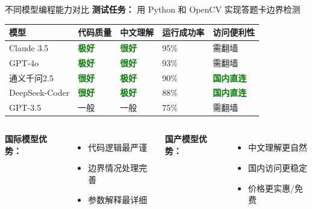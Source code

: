 
\begin{frame}{不同模型编程能力对比}
	\textbf{测试任务：} 用 Python 和 OpenCV 实现答题卡边界检测

	\vspace{0.3cm}

	\begin{table}
		\centering
		\small
		\begin{tabular}{p{2.5cm}p{2.5cm}p{2.5cm}p{2.5cm}p{2.5cm}}
			\toprule
			\textbf{模型} & \textbf{代码质量} & \textbf{中文理解} & \textbf{运行成功率} & \textbf{访问便利性} \\
			\midrule
			Claude 3.5     & \textcolor{green}{\textbf{极好}} & \textcolor{green}{\textbf{很好}} & 95\% & 需翻墙 \\
			GPT-4o         & \textcolor{green}{\textbf{极好}} & \textcolor{green}{\textbf{很好}} & 93\% & 需翻墙 \\
			通义千问2.5    & \textcolor{green}{\textbf{很好}} & \textcolor{green}{\textbf{极好}} & 90\% & \textcolor{green}{\textbf{国内直连}} \\
			DeepSeek-Coder & \textcolor{green}{\textbf{很好}} & \textcolor{green}{\textbf{极好}} & 88\% & \textcolor{green}{\textbf{国内直连}} \\
			GPT-3.5        & 一般 & 一般 & 75\% & 需翻墙 \\
			\bottomrule
		\end{tabular}
	\end{table}

	\vspace{0.3cm}

	\begin{columns}
		\textbf{国际模型优势：}
		\begin{itemize}
			\item 代码逻辑最严谨
			\item 边界情况处理完善
			\item 参数解释最详细
		\end{itemize}

		\textbf{国产模型优势：}
		\begin{itemize}
			\item 中文理解更自然
			\item 国内访问更稳定
			\item 价格更实惠/免费
		\end{itemize}
	\end{columns}
\end{frame}


